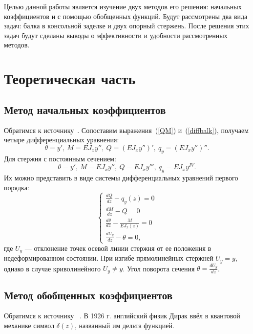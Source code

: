 \documentclass[12pt, a4paper]{article}
\begin{document}
Целью данной работы является изучение двух методов его решения: начальных коэффициентов и с помощью обобщенных функций. Будут рассмотрены два вида задач: балка в консольной заделке и двух опорный стержень. После решения этих задач будут сделаны выводы о эффективности и удобности рассмотренных методов.

\section{Теоретическая часть}

\subsection{Метод начальных коэффициентов}
Обратимся к источнику~\cite{Feofociev}.
Сопоставим выражения~(\ref{QM}) и~(\ref{diffbalk}), получаем четыре дифференциальных уравнения:
\begin{equation}
	\label{diffb4a}
	\theta = y',~M = E J_{x} y'',~Q = (E J_{x} y'')',~
	q_{y} = (E J_{x} y'')''.
\end{equation}
Для стержня с постоянным сечением:
\begin{equation}
	\label{diffb4}
	\theta = y',~M = E J_{x} y'',~Q = E J_{x} y''',~
	q_{y} = E J_{x} y^{IV}.
\end{equation}
Их можно представить в виде системы дифференциальных уравнений первого порядка:
\begin{equation}
	\label{diffb4}
	\begin{cases}
		\frac{d Q}{d z} - q_{y}(z) = 0\\
		\frac {d M}{d z} - Q = 0\\
		\frac{d \theta}{d z} - \frac{M}{E J_{x}(z)} = 0\\
		\frac{d U_{y}}{d z} - \theta = 0, 
	\end{cases}
\end{equation}
где $U_{y}$ --- отклонение точек осевой линии стержня от ее положения в недеформированном состоянии. При изгибе прямолинейных стержней $U_{y} = y$, однако в случае криволинейного $U_{y} \neq y$. Угол поворота сечения $\theta = \frac{d U_{y}}{d z}$.

\subsection{Метод обобщенных коэффициентов}
Обратимся к источнику ~\cite{Korneev}.
В 1926 г. английский физик Дирак ввёл в квантовой механике символ $\delta (z)$, названный им дельта функцией.
\end{document}
